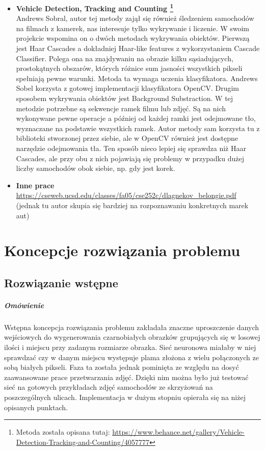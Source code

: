 \documentclass{article}
\begin{document}
\begin{itemize}
\item \textbf{Vehicle Detection, Tracking and Counting \footnote{Metoda została opisana tutaj: {\scriptsize \url{https://www.behance.net/gallery/Vehicle-Detection-Tracking-and-Counting/4057777}}}}\\[0.3cm]
Andrews Sobral, autor tej metody zajął się również śledzeniem samochodów na filmach z kamerek, nas interesuje tylko wykrywanie i liczenie. W swoim projekcie wspomina on o dwóch metodach wykrywania obiektów. Pierwszą jest Haar Cascades a dokładniej Haar-like features z wykorzystaniem Cascade Classifier. Polega ona na znajdywaniu na obrazie kilku sąsiadujących, prostokątnych obszarów, których różnice sum jasności wszystkich pikseli spełniają pewne warunki.  Metoda ta wymaga uczenia klasyfikatora. Andrews Sobel korzysta z gotowej implementacji klasyfikatora OpenCV. Drugim sposobem wykrywania obiektów jest Background Substraction.  W tej metodzie potrzebne są sekwencje ramek filmu lub zdjęć.  Są na nich wykonywane pewne operacje a później od każdej ramki jest odejmowane tło, wyznaczane na podstawie wszystkich ramek. Autor metody sam korzysta tu z biblioteki stworzonej przez siebie, ale w OpenCV również jest dostępne narzędzie odejmowania tła. Ten sposób nieco lepiej się sprawdza niż Haar Cascades, ale przy obu z nich pojawiają się problemy w przypadku dużej liczby samochodów obok siebie, np. gdy jest  korek.
\newpage
\item \textbf{Inne prace}\\[0.3cm]
{\scriptsize \url{https://cseweb.ucsd.edu/classes/fa05/cse252c/dlagnekov_belongie.pdf}} (jednak tu autor skupia się bardziej na rozpoznawaniu konkretnych marek aut)

\end{itemize}

\section{Koncepcje rozwiązania problemu}

\subsection{Rozwiązanie wstępne}
\subparagraph{Omówienie} Wstępna koncepcja rozwiązania problemu zakładała znaczne uproszczenie danych wejściowych do wygenerowania czarnobiałych obrazków grupujących się w losowej ilości i miejscu przy zadanym rozmiarze obrazka. Sieć neuronowa miałaby w niej sprawdzać czy w danym miejscu występuje plama złożona z wielu połączonych ze sobą białych pikseli. Faza ta została jednak pominięta ze względu na dosyć zaawansowane prace przetwarzania zdjęć. Dzięki nim można było już testować sieć na gotowych przykładach zdjęć samochodów ze skrzyżowań na poszczególnych ulicach. Implementacja w dużym stopniu opierała się na niżej opisanych punktach.
\end{document}
